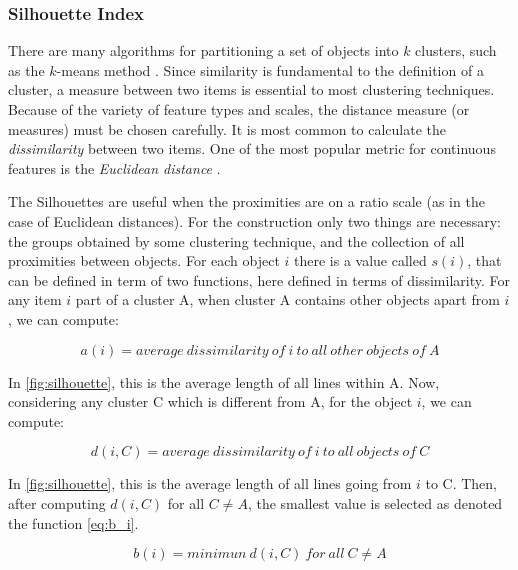 \documentclass[journal]{IEEEtran}
\begin{document}
\subsubsection{Silhouette Index}

There are many algorithms for partitioning a set of objects into $k$ clusters, such as the $k$-means method \cite{kanungo2002efficient}. Since similarity is fundamental to the definition of a cluster, a measure between two items is essential to most clustering techniques. Because of the variety of feature types and scales, the distance measure (or measures) must be chosen carefully. It is most common to calculate the \textit{dissimilarity} between two items. One of the most popular metric for continuous features is the \textit{Euclidean distance} \cite{jain1988algorithms}.

The Silhouettes are useful when the proximities are on a ratio scale (as in the case of Euclidean distances). For the construction only two things are necessary: the groups obtained by some clustering technique, and the collection of all proximities between objects. For each object $i$ there is a value called $s(i)$, that can be defined in term of two functions, here defined in terms of dissimilarity. For any item $i$ part of a cluster A, when cluster A contains other objects apart from $i$, we can compute:

\begin{equation} \label{eq:a_i}
a(i) = average~dissimilarity~of~i~to~all~other~objects~of~A
\end{equation}

In \ref{fig:silhouette}, this is the average length of all lines within A. Now, considering any cluster C which is different from A, for the object $i$, we can compute:

\begin{equation} \label{eq:d_i}
d(i, C) = average~dissimilarity~of~i~to~all~objects~of~C
\end{equation}

In \ref{fig:silhouette}, this is the average length of all lines going from $i$ to C. Then, after computing $d(i, C)$ for all $C \neq A$, the smallest value is selected as denoted the function \ref{eq:b_i}.

\begin{equation} \label{eq:b_i}
b(i) = minimun~d(i, C)~for~all~C \neq A
\end{equation}
\end{document}
